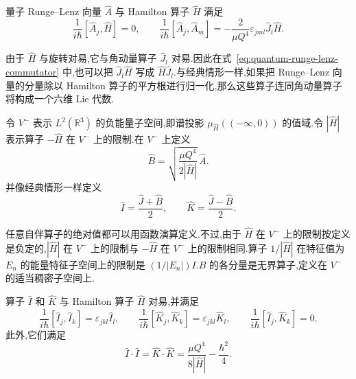 {\begin{lemma}\label{lem:quantum-runge-lenz-commutator}
量子 Runge--Lenz 向量 $\widehat A$ 与 Hamilton 算子 $\widehat H$ 满足
\[
 \frac1{i\hbar}[\widehat A_j,\widehat H]=0,
\qquad
 \frac1{i\hbar}[\widehat A_j,\widehat A_m]
 =-\frac2{\mu Q^4}\varepsilon_{jml}\widehat J_l\widehat H.
\label{eq:quantum-runge-lenz-commutator}
\]
\end{lemma}

由于 $\widehat H$ 与旋转对易,它与角动量算子 $\widehat J_l$ 对易.因此在式~\eqref{eq:quantum-runge-lenz-commutator} 中,也可以把 $\widehat J_l\widehat H$ 写成 $\widehat H\widehat J_l$.与经典情形一样,如果把 Runge--Lenz 向量的分量除以 Hamilton 算子的平方根进行归一化,那么这些算子连同角动量算子将构成一个六维 Lie 代数.

\begin{definition}[量子负能量子空间上的归一化算子]\label{def:quantum-normalized-runge-lenz}
令 $V^-$ 表示 $L^2(\mathbb R^3)$ 的负能量子空间,即谱投影 $\mu_{\widehat H}((-\infty,0))$ 的值域.令 $|\widehat H|$ 表示算子 $-\widehat H$ 在 $V^-$ 上的限制.在 $V^-$ 上定义
\[
 \widehat B=\sqrt{\frac{\mu Q^4}{2|\widehat H|}}\,\widehat A.
\]
并像经典情形一样定义
\[
 \widehat I=\frac{\widehat J+\widehat B}{2},
 \qquad
 \widehat K=\frac{\widehat J-\widehat B}{2}.
\]
\end{definition}

任意自伴算子的绝对值都可以用函数演算定义.不过,由于 $\widehat H$ 在 $V^-$ 上的限制按定义是负定的,$|\widehat H|$ 在 $V^-$ 上的限制与 $-\widehat H$ 在 $V^-$ 上的限制相同.算子 $1/|\widehat H|$ 在特征值为 $E_n$ 的能量特征子空间上的限制是 $(1/|E_n|)I$.$\widehat B$ 的各分量是无界算子,定义在 $V^-$ 的适当稠密子空间上.

\begin{theorem}\label{thm:quantum-so4-symmetry}
算子 $\widehat I$ 和 $\widehat K$ 与 Hamilton 算子 $\widehat H$ 对易,并满足
\[
 \frac1{i\hbar}[\widehat I_j,\widehat I_k]=\varepsilon_{jkl}\widehat I_l,
\qquad
 \frac1{i\hbar}[\widehat K_j,\widehat K_k]=\varepsilon_{jkl}\widehat K_l,
\qquad
 \frac1{i\hbar}[\widehat I_j,\widehat K_k]=0.
\label{eq:quantum-runge-lenz-so4-brackets}
\]
此外,它们满足
\[
 \widehat I\cdot\widehat I=\widehat K\cdot\widehat K
 =\frac{\mu Q^4}{8|\widehat H|}-\frac{\hbar^2}{4}.
\label{eq:quantum-runge-lenz-so4-casimir}
\]
\end{theorem}

}


